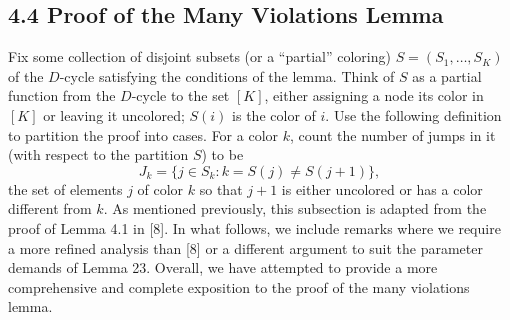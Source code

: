 \documentclass[10pt,a4paper]{article}
\begin{document}
\subsection*{4.4 Proof of the Many Violations Lemma}
Fix some collection of disjoint subsets (or a ``partial'' coloring) $S=(S_1,\ldots,S_K)$ of the $D$-cycle satisfying the conditions of the lemma. Think of $S$ as a partial function from the $D$-cycle to the set $[K]$, either assigning a node its color in $[K]$ or leaving it uncolored; $S(i)$ is the color of $i$. Use the following definition to partition the proof into cases. For a color $k$, count the number of jumps in it (with respect to the partition $S$) to be
\[J_k=\{j\in S_k:k=S(j)\neq S(j+1)\},\]
the set of elements $j$ of color $k$ so that $j+1$ is either uncolored or has a color different from $k$. As mentioned previously, this subsection is adapted from the proof of Lemma 4.1 in [8]. In what follows, we include remarks where we require a more refined analysis than [8] or a different argument to suit the parameter demands of Lemma 23. Overall, we have attempted to provide a more comprehensive and complete exposition to the proof of the many violations lemma.
\end{document}
